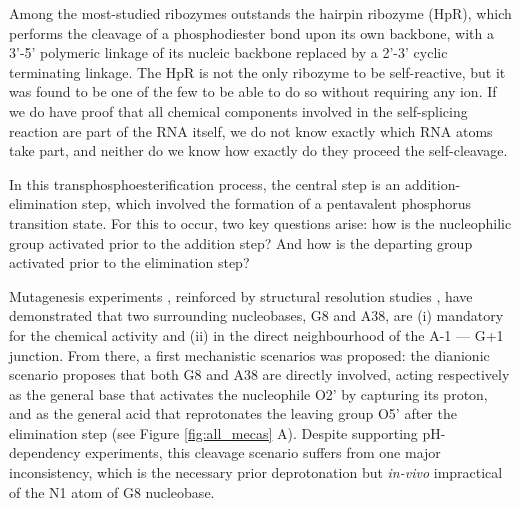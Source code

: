 \documentclass[journal=jacsat,manuscript=article]{achemso}
\begin{document}
Among the most-studied ribozymes outstands the hairpin ribozyme (HpR), which performs the cleavage of a phosphodiester bond upon its own backbone,
with a 3'-5' polymeric linkage of its nucleic backbone replaced by a 2'-3' cyclic terminating linkage.  
The HpR is not the only ribozyme to be self-reactive, but it was found to be one of the few to be able to do so without requiring any ion. 
If we do have proof that all chemical components involved in the self-splicing reaction are part of the RNA itself, we do not 
know exactly which RNA atoms take part, and neither do we know how exactly do they proceed the self-cleavage. 

In this transphosphoesterification process, 
the central step is an addition-elimination step, which involved the formation of a pentavalent phosphorus transition state.
For this to occur, two key questions arise: how is the nucleophilic group activated prior to the addition step?
And how is the departing group activated prior to the elimination step?

Mutagenesis experiments \cite{kuzmin_role_2005}, reinforced by structural resolution studies \cite{rupert_crystal_2001,salter_water_2006},
have demonstrated that two surrounding nucleobases, G8 and A38, are (i) mandatory for the chemical activity and (ii) in the direct neighbourhood of the A-1 --- G+1 junction.
From there, a first mechanistic scenarios was proposed: the dianionic scenario proposes that both G8 and A38 are directly involved, 
acting respectively as the general base that activates the nucleophile O2' by capturing its proton, 
and as the general acid that reprotonates the leaving group O5' after the elimination step (see Figure \ref{fig:all_mecas} A).
Despite supporting pH-dependency experiments, this cleavage scenario suffers from one major inconsistency, 
which is the necessary prior deprotonation but \textit{in-vivo} impractical of the N1 atom of G8 nucleobase.
\end{document}
